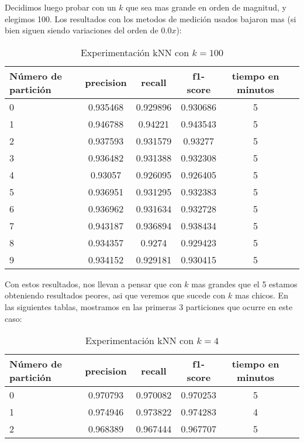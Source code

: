 Decidimos luego probar con un $k$ que sea mas grande en orden de magnitud, y elegimos 100.  Los resultados con los metodos de medici\'on usados bajaron mas (si bien siguen siendo variaciones del orden de $0.0x$):

\begin{table}[H]
\centering
\begin{tabular}{| l | c | c | c | c | c |}
\hline
N\'umero de partici\'on & precision & recall & f1-score & tiempo en minutos \\
\hline

0 & 0.935468 & 0.929896 & 0.930686 & 5 \\
1 & 0.946788 & 0.94221 & 0.943543 & 5 \\
2 & 0.937593 & 0.931579 & 0.93277 & 5 \\
3 & 0.936482 & 0.931388 & 0.932308 & 5 \\
4 & 0.93057 & 0.926095 & 0.926405 & 5 \\
5 & 0.936951 & 0.931295 & 0.932383 & 5 \\
6 & 0.936962 & 0.931634 & 0.932728 & 5 \\
7 & 0.943187 & 0.936894 & 0.938434 & 5 \\
8 & 0.934357 & 0.9274 & 0.929423 & 5 \\
9 & 0.934152 & 0.929181 & 0.930415 & 5 \\

\hline
\end{tabular}
\caption{Experimentaci\'on kNN con $k=100$}
\end{table}

Con estos resultados, nos llevan a pensar que con $k$ mas grandes que el 5 estamos obteniendo resultados peores, asi que veremos que sucede con $k$ mas chicos. En las siguientes tablas, mostramos en las primeras 3 particiones que ocurre en este caso:

\begin{table}[H]
\centering
\begin{tabular}{| l | c | c | c | c | c |}
\hline
N\'umero de partici\'on & precision & recall & f1-score & tiempo en minutos \\
\hline

0 & 0.970793 & 0.970082 & 0.970253 & 5 \\
1 & 0.974946 & 0.973822 & 0.974283 & 4 \\
2 & 0.968389 & 0.967444 & 0.967707 & 5 \\

\hline
\end{tabular}
\caption{Experimentaci\'on kNN con $k=4$}
\end{table}

